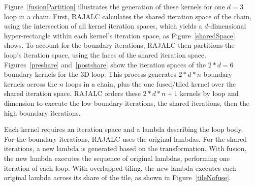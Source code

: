 Figure~\ref{fusionPartition} illustrates the generation of these kernels
for one $d=3$ loop in a chain. 
First, RAJALC calculates the shared iteration space of the chain, using the
intersection of all kernel iteration spaces, which yields a $d$-dimensional
hyper-rectangle within each kernel's iteration space, as
Figure~\ref{sharedSpace} shows.
To account for the boundary iterations, RAJALC then partitions the loop's
iteration space, using the faces of the shared iteration space.
Figures~\ref{preshare} and~\ref{postshare} show the iteration spaces of the
$2*d=6$ boundary kernels for the 3D loop. 
This process generates $2*d*n$ boundary kernels across the $n$ loops in a
chain, plus the one fused/tiled kernel over the shared iteration space. 
RAJALC orders these $2*d*n+1$ kernels by loop and dimension to execute the low
boundary iterations, the shared iterations, then the high boundary iterations.

Each kernel requires an iteration space and a lambda describing the loop body. 
For the boundary iterations, RAJALC uses the original lambdas. 
For the shared iterations, a new lambda is generated based on the transformation. 
With fusion, the new lambda executes the sequence of original lambdas, performing one iteration of each loop.
With overlapped tiling, the new lambda executes each original lambda across its share of the tile, as shown in Figure~\ref{tileNofuse}.


